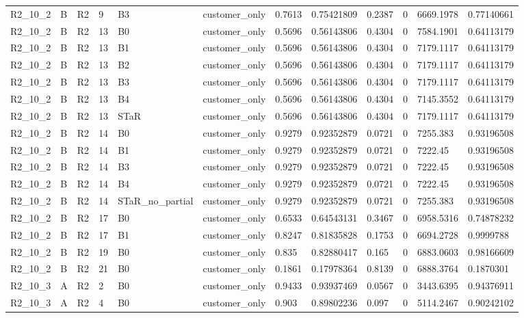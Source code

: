 \begin{longtable}{llllllllllll}
R2\_10\_2 & B & R2 & 9 & B3 & customer\_only & 0.7613 & 0.75421809 & 0.2387 & 0 & 6669.1978 & 0.77140661 \\
R2\_10\_2 & B & R2 & 13 & B0 & customer\_only & 0.5696 & 0.56143806 & 0.4304 & 0 & 7584.1901 & 0.64113179 \\
R2\_10\_2 & B & R2 & 13 & B1 & customer\_only & 0.5696 & 0.56143806 & 0.4304 & 0 & 7179.1117 & 0.64113179 \\
R2\_10\_2 & B & R2 & 13 & B2 & customer\_only & 0.5696 & 0.56143806 & 0.4304 & 0 & 7179.1117 & 0.64113179 \\
R2\_10\_2 & B & R2 & 13 & B3 & customer\_only & 0.5696 & 0.56143806 & 0.4304 & 0 & 7179.1117 & 0.64113179 \\
R2\_10\_2 & B & R2 & 13 & B4 & customer\_only & 0.5696 & 0.56143806 & 0.4304 & 0 & 7145.3552 & 0.64113179 \\
R2\_10\_2 & B & R2 & 13 & STaR & customer\_only & 0.5696 & 0.56143806 & 0.4304 & 0 & 7179.1117 & 0.64113179 \\
R2\_10\_2 & B & R2 & 14 & B0 & customer\_only & 0.9279 & 0.92352879 & 0.0721 & 0 & 7255.383 & 0.93196508 \\
R2\_10\_2 & B & R2 & 14 & B1 & customer\_only & 0.9279 & 0.92352879 & 0.0721 & 0 & 7222.45 & 0.93196508 \\
R2\_10\_2 & B & R2 & 14 & B3 & customer\_only & 0.9279 & 0.92352879 & 0.0721 & 0 & 7222.45 & 0.93196508 \\
R2\_10\_2 & B & R2 & 14 & B4 & customer\_only & 0.9279 & 0.92352879 & 0.0721 & 0 & 7222.45 & 0.93196508 \\
R2\_10\_2 & B & R2 & 14 & STaR\_no\_partial & customer\_only & 0.9279 & 0.92352879 & 0.0721 & 0 & 7255.383 & 0.93196508 \\
R2\_10\_2 & B & R2 & 17 & B0 & customer\_only & 0.6533 & 0.64543131 & 0.3467 & 0 & 6958.5316 & 0.74878232 \\
R2\_10\_2 & B & R2 & 17 & B1 & customer\_only & 0.8247 & 0.81835828 & 0.1753 & 0 & 6694.2728 & 0.9999788 \\
R2\_10\_2 & B & R2 & 19 & B0 & customer\_only & 0.835 & 0.82880417 & 0.165 & 0 & 6883.0603 & 0.98166609 \\
R2\_10\_2 & B & R2 & 21 & B0 & customer\_only & 0.1861 & 0.17978364 & 0.8139 & 0 & 6888.3764 & 0.1870301 \\
R2\_10\_3 & A & R2 & 2 & B0 & customer\_only & 0.9433 & 0.93937469 & 0.0567 & 0 & 3443.6395 & 0.94376911 \\
R2\_10\_3 & A & R2 & 4 & B0 & customer\_only & 0.903 & 0.89802236 & 0.097 & 0 & 5114.2467 & 0.90242102 \\

\end{longtable}
